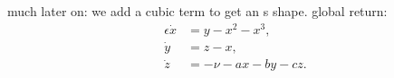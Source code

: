 much later on: we add a cubic term to get an s shape. global return:
\begin{align*}
\epsilon \dot{x} &= y - x^2 - x^3, \\
\dot{y} &= z - x, \\
\dot{z} &= -\nu -ax -by -cz.
\end{align*}








